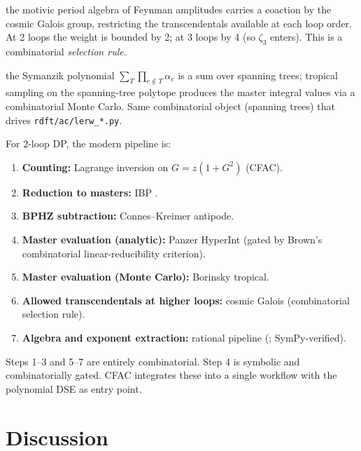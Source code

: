 \documentclass[11pt,a4paper]{article}
\theoremstyle{definition}
\theoremstyle{plain}
\begin{document}
\begin{acbox}
\cite{Brown2015,Brown2017} the motivic period algebra of Feynman
amplitudes carries a coaction by the cosmic Galois group, restricting
the transcendentals available at each loop order.  At 2 loops the
weight is bounded by 2; at 3 loops by 4 (so $\zeta_3$ enters).  This
is a combinatorial \emph{selection rule}.
\end{acbox}

\begin{acbox}
\cite{Borinsky2020,BorinskyMunch2023} the Symanzik polynomial $\sum_T
\prod_{e \notin T} \alpha_e$ is a sum over spanning trees; tropical
sampling on the spanning-tree polytope produces the master integral
values via a combinatorial Monte Carlo.  Same combinatorial object
(spanning trees) that drives \texttt{rdft/ac/lerw\_*.py}.
\end{acbox}

\begin{cfacbox}
For 2-loop DP, the modern pipeline is:
\begin{enumerate}[leftmargin=2em]
  \item \textbf{Counting:}  Lagrange inversion on $G = z(1+G^2)$ (CFAC).
  \item \textbf{Reduction to masters:}  IBP \cite{Smirnov2012}.
  \item \textbf{BPHZ subtraction:}  Connes--Kreimer antipode.
  \item \textbf{Master evaluation (analytic):}  Panzer HyperInt
    (gated by Brown's combinatorial linear-reducibility criterion).
  \item \textbf{Master evaluation (Monte Carlo):}  Borinsky tropical.
  \item \textbf{Allowed transcendentals at higher loops:}  cosmic
    Galois (combinatorial selection rule).
  \item \textbf{Algebra and exponent extraction:}  rational pipeline
    (; SymPy-verified).
\end{enumerate}
Steps 1--3 and 5--7 are entirely combinatorial.  Step 4 is symbolic
and combinatorially gated.  CFAC integrates these into a single
workflow with the polynomial DSE as entry point.
\end{cfacbox}

\section{Discussion}\label{sec:discussion}
\end{document}

